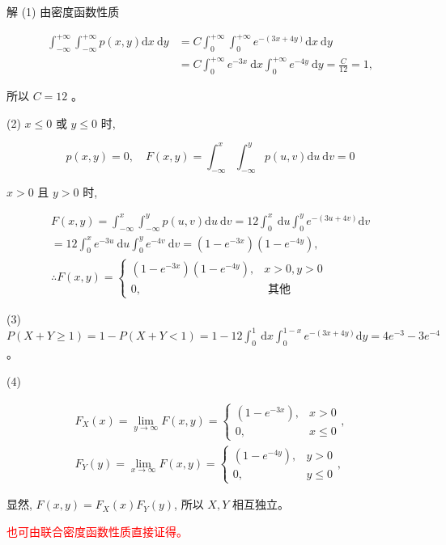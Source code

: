\documentclass{beamer}
\newcommand{\new}[1]{\textcolor{red}{#1}}
\begin{document}
	\begin{frame}
		解 (1) 由密度函数性质
		
		$$
		\begin{aligned}
			\int_{-\infty}^{+\infty} \int_{-\infty}^{+\infty} p(x, y) \mathrm{d} x \mathrm{~d} y & =C \int_{0}^{+\infty} \int_{0}^{+\infty} e^{-(3 x+4 y)} \mathrm{d} x \mathrm{~d} y \\
			& =C \int_{0}^{+\infty} e^{-3 x} \mathrm{~d} x \int_{0}^{+\infty} e^{-4 y} \mathrm{~d} y=\frac{C}{12}=1,
		\end{aligned}
		$$
		
		所以 $C=12$ 。
		
		(2) $x \leqslant 0$ 或 $y \leqslant 0$ 时,
		
		$$
		p(x, y)=0, \quad F(x, y)=\int_{-\infty}^{x} \int_{-\infty}^{y} p(u, v) \mathrm{d} u \mathrm{~d} v=0
		$$
		
		$x>0$ 且 $y>0$ 时,
		
		$$
		\begin{array}{r}
			F(x, y)=\int_{-\infty}^{x} \int_{-\infty}^{y} p(u, v) \mathrm{d} u \mathrm{~d} v=12 \int_{0}^{x} \mathrm{~d} u \int_{0}^{y} e^{-(3 u+4 v)} \mathrm{d} v \\
			=12 \int_{0}^{x} e^{-3 u} \mathrm{~d} u \int_{0}^{y} e^{-4 v} \mathrm{~d} v=\left(1-e^{-3 x}\right)\left(1-e^{-4 y}\right), \\
			\therefore F(x, y)=\left\{\begin{array}{cc}
				\left(1-e^{-3 x}\right)\left(1-e^{-4 y}\right), & x>0, y>0 \\
				0, & \text { 其他 }
			\end{array}\right.
		\end{array}
		$$
	\end{frame}
	
	\begin{frame}
		(3) $P(X+Y \geqslant 1)=1-P(X+Y<1)=1-12 \int_{0}^{1} \mathrm{~d} x \int_{0}^{1-x} e^{-(3 x+4 y)} \mathrm{d} y=4 e^{-3}-3 e^{-4}$ 。
		
		(4)
		
		$$
		\begin{gathered}
			F_{X}(x)=\lim _{y \rightarrow \infty} F(x, y)=\left\{\begin{array}{cc}
				\left(1-e^{-3 x}\right), & x>0 \\
				0, & x \leqslant 0
			\end{array},\right. \\
			F_{Y}(y)=\lim _{x \rightarrow \infty} F(x, y)=\left\{\begin{array}{cc}
				\left(1-e^{-4 y}\right), & y>0 \\
				0, & y \leqslant 0
			\end{array},\right.
		\end{gathered}
		$$
		
		显然, $F(x, y)=F_{X}(x) F_{Y}(y)$, 所以 $X, Y$ 相互独立。
		
		\new{也可由联合密度函数性质直接证得。}
	\end{frame}
	
\end{document}
